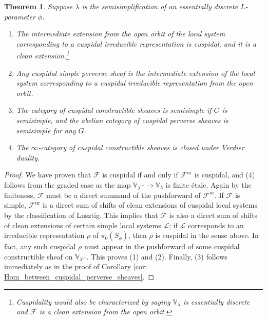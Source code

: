 \documentclass{amsart}
\newtheorem{theorem}{Theorem}[subsection]
\theoremstyle{definition}
\theoremstyle{remark}
\numberwithin{equation}{section}
\newcommand{\mc}{\mathcal}
\newcommand{\ur}{\mathrm{ur}}
\newcommand{\V}{\mathbb{V}}
\begin{document}
\begin{theorem}\label{thm: ClassificationCuspidalPerverseSheaves}
Suppose $\lambda$ is the semisimplification of an essentially discrete $L$-parameter $\phi$.  
\begin{enumerate}
    \item The intermediate extension from the open orbit of the local system corresponding to a cuspidal irreducible representation is cuspidal, and it is a clean extension.\footnote{Cuspidality would also be characterized by saying $\V_\lambda$ is essentially discrete and $\mc F$ is a clean extension from the open orbit.}
    \item Any cuspidal simple perverse sheaf is the intermediate extension of the local system corresponding to a cuspidal irreducible representation from the open orbit. 
    \item The category of cuspidal constructible sheaves is semisimple if $G$ is semisimple, and the abelian category of cuspidal perverse sheaves is semisimple for any $G$.
    \item The $\infty$-category of cuspidal constructible sheaves is closed under Verdier duality. 
\end{enumerate}
\end{theorem}

\begin{proof}
We have proven that $\mc F$ is cuspidal if and only if $\mc F^\ur$ is cuspidal, and (4) follows from the graded case as the map $\V_{\lambda^\ur}\to \V_\lambda$ is finite \'etale. Again by the finiteness, $\mc F$ must be a direct summand of the pushforward of $\mc F^\ur$. If $\mc F$ is simple, $\mc F^\ur$ is a direct sum of shifts of clean extensions of cuspidal local systems by the classification of Lusztig. This implies that $\mc F$ is also a direct sum of shifts of clean extensions of certain simple local systems $\mc L$; if $\mc L$ corresponds to an irreducible representation $\rho$ of $\pi_0(S_\phi)$, then $\rho$ is cuspidal in the sense above. In fact, any such cuspidal $\rho$ must appear in the pushforward of some cuspidal constructible sheaf on $\V_{\lambda^\ur}$. This proves (1) and (2). Finally, (3) follows immediately as in the proof of Corollary \ref{cor: Hom_between_cuspidal_perverse_sheaves}.
\end{proof}
\end{document}
